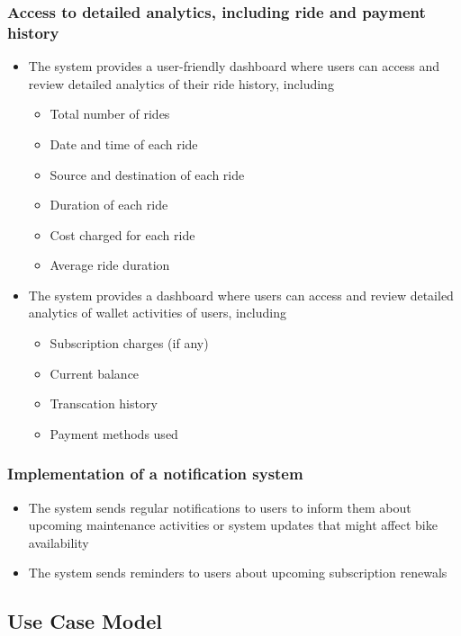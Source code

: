 \documentclass[11pt]{article}
\begin{document}
\subsubsection{Access to detailed analytics, including ride and payment history}
\begin{itemize}
    \item The system provides a user-friendly dashboard where users can access and review detailed analytics of their ride history, including
    \begin{itemize}
        \item Total number of rides
        \item Date and time of each ride
        \item Source and destination of each ride
        \item Duration of each ride
        \item Cost charged for each ride
        \item Average ride duration
    \end{itemize}
    \item The system provides a dashboard where users can access and review detailed analytics of wallet activities of users, including
    \begin{itemize}
        \item Subscription charges (if any)
        \item Current balance
        \item Transcation history
        \item Payment methods used
    \end{itemize}
\end{itemize}

\subsubsection{Implementation of a notification system}
\begin{itemize}
    \item The system sends regular notifications to users to inform them about upcoming maintenance activities or system updates that might affect bike availability
    \item The system sends reminders to users about upcoming subscription renewals
\end{itemize}

\subsection{Use Case Model}
\end{document}
